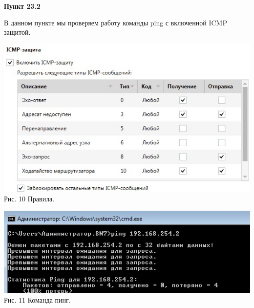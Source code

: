 \documentclass[a4paper,14pt]{extarticle}
\begin{document}
    \textbf{Пункт 23.2}
    \vspace{-3ex}
    \begin{center}
        \singlespacing
        В данном пункте мы проверяем работу команды ping с включенной ICMP защитой.

        \begin{multicols}{2}
           \includegraphics[scale=0.45]{pics/23.2_1.jpg}
            Рис. 10 Правила.
            \columnbreak

            \includegraphics[scale=0.45]{pics/23.2_2.jpg}
            Рис. 11 Команда пинг.
        \end{multicols}
    \end{center}
\end{document}
